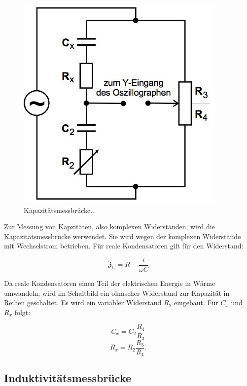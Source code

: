 \begin{figure}
  \centering
  \includegraphics[scale=0.5]{content/kapazitätsbrücke.jpg}
  \caption{Kapazitätsmessbrücke.\cite{anleitung302}.}
  \label{fig:kapazität}
\end{figure}

Zur Messung von Kapzitäten, also komplexen Widerständen, wird die Kapazitätsmessbrücke werwendet. Sie wird wegen der komplexen Widerstände mit Wechselstrom betrieben.
Für reale Kondensatoren gilt für den Widerstand:

\begin{equation}
  \mathfrak{Z}_C = R - \frac{i}{\omega C}
\end{equation}

Da reale Kondensatoren einen Teil der elektrischen Energie in Wärme umwandeln, wird im Schaltbild ein ohmscher Widerstand zur Kapazität in Reihen geschaltet.
Es wird ein variabler Widerstand $R_{2}$ eingebaut. Für $C_x$ und $R_x$ folgt:

\begin{equation}
  \label{eqn:kapazität1}
  C_x = C_{2} \frac{R_4}{R_3}
\end{equation}
\begin{equation}
  \label{eqn:kapazität2}
  R_x = R_{2} \frac{R_3}{R_4}.
\end{equation}

\subsection{Induktivitätsmessbrücke}

